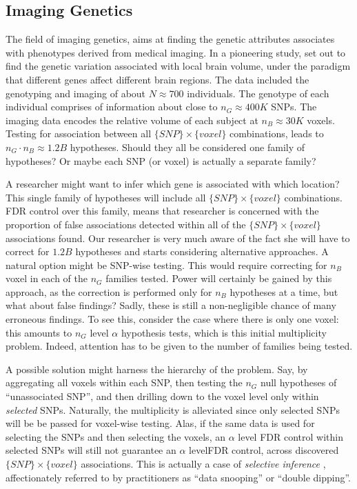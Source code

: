 \documentclass[review,12pt]{article}
\begin{document}
\subsection{\label{eg:imaging_genetics}Imaging Genetics}
The field of imaging genetics, aims at finding the genetic attributes associates with phenotypes derived from medical imaging. In a pioneering study, \citet{stein_voxelwise_2010} set out to find the genetic variation associated with local brain volume, under the paradigm that different genes affect different brain regions. The data included the genotyping and imaging of about $N \approx 700$ individuals. The genotype of each individual comprises of information about close to $n_G \approx 400K$ SNPs. The imaging data encodes the relative volume of each subject at $n_B \approx 30K$ voxels. Testing for association between all $\{SNP\} \times \{voxel\}$ combinations, leads to $n_G \cdot n_B \approx 1.2B$ hypotheses. Should they all be considered one family of hypotheses? Or maybe each SNP (or voxel) is actually a separate family? 

A researcher might want to infer which gene is associated with which location? This single family of hypotheses will include all $\{SNP\} \times \{voxel\}$ combinations. FDR control over this family, means that researcher is concerned with the proportion of false associations detected within all of the $\{SNP\} \times \{voxel\}$ associations found. Our researcher is very much aware of the fact she will have to correct for $1.2B$ hypotheses and starts considering alternative approaches. A natural option might be SNP-wise testing. This would require correcting for $n_B$ voxel in each of the $n_G$  families tested. Power will certainly be gained by this approach, as the correction is performed only for $n_B$ hypotheses at a time, but what about false findings? Sadly, these is still a non-negligible chance of many erroneous findings. To see this, consider the case where there is only one voxel: this amounts to $n_G$ level $\alpha$ hypothesis tests, which is this initial multiplicity problem. Indeed, attention has to be given to the number of families being tested. 

A possible solution might harness the hierarchy of the problem. Say, by aggregating all voxels within each SNP, then testing the $n_G$ null hypotheses of ``unassociated SNP'', and then drilling down to the voxel level only within \emph{selected} SNPs. Naturally, the multiplicity is alleviated since only selected SNPs will be be passed for voxel-wise testing. Alas, if the same data is used for selecting the SNPs and then selecting the voxels, an $\alpha$ level FDR control within selected SNPs will still not guarantee an $\alpha$ levelFDR control, across discovered $\{SNP\} \times \{voxel\}$ associations. This is actually a case of \emph{selective inference} \citep{benjamini_simultaneous_2010}, affectionately referred to by practitioners as ``data snooping'' or ``double dipping''. 
\end{document}
